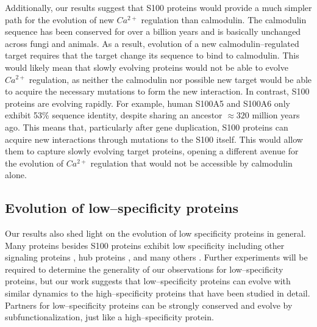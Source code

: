 Additionally, our results suggest that S100 proteins would provide
a much simpler path for the evolution of new $Ca^{2+}$ regulation
than calmodulin. The calmodulin sequence has been conserved for over
a billion years and is basically unchanged across fungi and animals.
As a result, evolution of a new calmodulin--regulated target requires
that the target change its sequence to bind to calmodulin. This would
likely mean that slowly evolving proteins would not be able to evolve
$Ca^{2+}$ regulation, as neither the calmodulin nor possible new
target would be able to acquire the necessary mutations to form the
new interaction. In contrast, S100 proteins are evolving rapidly.
For example, human S100A5 and S100A6 only exhibit 53\% sequence identity,
despite sharing an ancestor $\approx320$ million years ago. This
means that, particularly after gene duplication, S100 proteins can
acquire new interactions through mutations to the S100 itself. This
would allow them to capture slowly evolving target proteins, opening
a different avenue for the evolution of $Ca^{2+}$ regulation that
would not be accessible by calmodulin alone. 

\subsection{Evolution of low--specificity proteins}

Our results also shed light on the evolution of low specificity proteins
in general. Many proteins besides S100 proteins exhibit low specificity
including other signaling proteins \citep{chin_calmodulin:_2000,bhattacharya_target_2004},
hub proteins \citep{ekman_what_2006,bertolazzi_functional_2013,peleg_evolution_2014,uchikoga_specificity_2016},
and many others \citep{kreegipuu_statistical_1998,howard_ancestral_2014,nakahara_tobacco_2012,mitchell_evolutionary_2013,schreiber_protein_2011}.
Further experiments will be required to determine the generality of
our observations for low--specificity proteins, but our work suggests
that low--specificity proteins can evolve with similar dynamics to
the high--specificity proteins that have been studied in detail. Partners
for low--specificity proteins can be strongly conserved and evolve
by subfunctionalization, just like a high--specificity protein. 


